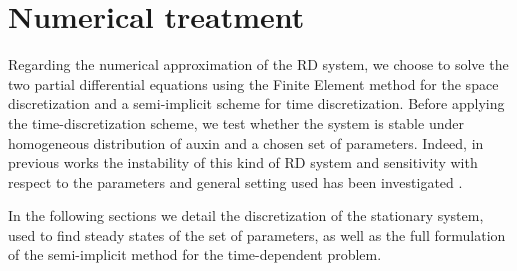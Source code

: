 \section{Numerical treatment}\label{sec:num_cap2}
Regarding the numerical approximation of the RD system, we choose to solve the two partial differential equations using the Finite Element method for the space discretization and a semi-implicit scheme for time discretization. Before applying the time-discretization scheme, we test whether the system is stable under homogeneous distribution of auxin and a chosen set of parameters. Indeed, in previous works the instability of this kind of RD system and sensitivity with respect to the parameters and general setting used has been investigated \cite{intra1_R, phdthesis:victor}.

In the following sections we detail the discretization of the stationary system, used to find steady states of the set of parameters, as well as the full formulation of the semi-implicit method for the time-dependent problem.


